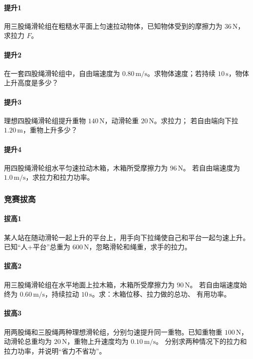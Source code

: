 \documentclass[12pt,a4paper]{ctexart}
\begin{document}
\paragraph{提升1}
用三股绳滑轮组在粗糙水平面上匀速拉动物体，已知物体受到的摩擦力为
$36\,\mathrm{N}$，求拉力 $F$。

\paragraph{提升2}
在一套四股绳滑轮组中，自由端速度为 $0.80\,\mathrm{m/s}$。求物体速度；若持续
$10\,\mathrm{s}$，物体上升高度是多少？

\paragraph{提升3}
理想四股绳滑轮组提升重物 $140\,\mathrm{N}$，动滑轮重 $20\,\mathrm{N}$。求拉力；
若自由端向下拉 $1.20\,\mathrm{m}$，重物上升多少？

\paragraph{提升4}
用四股绳滑轮组水平匀速拉动木箱，木箱所受摩擦力为 $96\,\mathrm{N}$。
若自由端速度为 $1.0\,\mathrm{m/s}$，求拉力和拉力功率。

\subsubsection*{竞赛拔高}
\paragraph{拔高1}
某人站在随动滑轮一起上升的平台上，用手向下拉绳使自己和平台一起匀速上升。
已知“人+平台”总重为 $600\,\mathrm{N}$，忽略滑轮和绳重，求手的拉力。

\paragraph{拔高2}
用三股绳滑轮组在水平地面上拉木箱，木箱所受摩擦力为 $90\,\mathrm{N}$。
若自由端速度始终为 $0.60\,\mathrm{m/s}$，持续拉动 $10\,\mathrm{s}$。求：木箱位移、拉力做的总功、
有用功率。

\paragraph{拔高3}
用两股绳和三股绳两种理想滑轮组，分别匀速提升同一重物。已知重物重
$100\,\mathrm{N}$，动滑轮总重均为 $20\,\mathrm{N}$，重物上升速度均为 $0.10\,\mathrm{m/s}$。
分别求两种情况下的拉力和拉力功率，并说明“省力不省功”。
\end{document}
